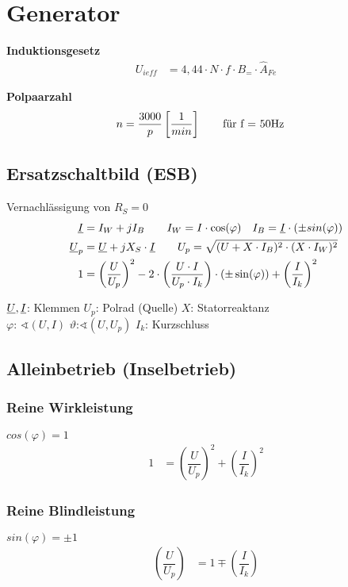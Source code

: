 \section{Generator}
\textbf{Induktionsgesetz}
\begin{align*}
    U_{ieff} &= 4,44 \cdot N \cdot f \cdot B_= \cdot \hat{A}_{Fe}
\end{align*}

\textbf{Polpaarzahl}
\begin{align*}
    n &= \dfrac{3000}{p} \left[ \frac{1}{min}\right] \qquad \textnormal{für f = 50Hz}
    \end{align*}

\subsection{Ersatzschaltbild (ESB)}
Vernachlässigung von $R_S = 0$
\begin{align*}
    \underline{I} &= I_W +jI_B \qquad I_W = I \cdot \cos(\varphi) \quad I_B = \underline{I}\cdot (\pm sin(\varphi))\\
    \underline{U}_p &= \underline{U} +jX_S \cdot \underline{I} \qquad
    U_p = \sqrt{(U+X\cdot I_B)^2 \cdot (X\cdot I_W)^2}\\
    1 &= \left( \dfrac{U}{U_p} \right)^2 - 2 \cdot \left( \dfrac{U \cdot I}{U_p \cdot I_k}\right) \cdot (\pm \sin(\varphi)) + \left(\dfrac{I}{I_k}\right)^2
\end{align*}

$\underline{U}, \underline{I}$: Klemmen \quad $U_p$: Polrad (Quelle) \quad $X$: Statorreaktanz \\
$\varphi$: $\sphericalangle (U, I)$ \qquad $\vartheta$:$\sphericalangle (U, U_p)$ \qquad $I_k$: Kurzschluss

\subsection{Alleinbetrieb (Inselbetrieb)}
\subsubsection{Reine Wirkleistung}
$cos(\varphi) = 1$
\begin{align*}
    1 &= \left( \dfrac{U}{U_p} \right)^2 + \left(\dfrac{I}{I_k}\right)^2
\end{align*}

\subsubsection{Reine Blindleistung}
$    sin(\varphi) = \pm1$
\begin{align*}
    \left( \dfrac{U}{U_p} \right) &= 1 \mp \left(\dfrac{I}{I_k}\right)
\end{align*}

